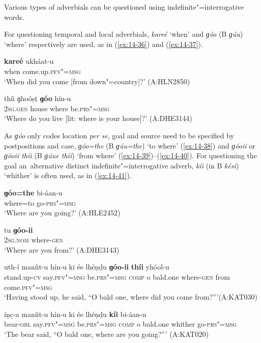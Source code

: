  Various types of adverbials can be questioned using indefinite"=interrogative words.


For questioning temporal and local adverbials, \textit{kareé} `when' and \textit{ɡóo} (B \textit{ɡúu}) `where' respectively are used, as in (\ref{ex:14-36}) and (\ref{ex:14-37}). 

\begin{exe}
\ex
\label{ex:14-36}
\gll \textbf{kareé} ukháat-u \\
when come.up.\textsc{pfv"=msg} \\
\glt `When did you come [from down"=country]?' (A:HLN2850)

\ex
\label{ex:14-37}
\gll thíi ɡhoóṣṭ \textbf{ɡóo} hín-u \\
\textsc{2sg.gen} house where be.\textsc{prs"=msg} \\
\glt `Where do you live [lit: where is your house]?' (A:DHE3144)
\end{exe}

As \textit{ɡóo} only codes location \textit{per se}, goal and source need to be specified by postpositions and case, \textit{ɡóo=the} (B \textit{ɡúu=the}) `to where' (\ref{ex:14-38}) and \textit{ɡóoii} or \textit{ɡóoii thíi} (B \textit{ɡúue thíi}) `from where' (\ref{ex:14-39})--(\ref{ex:14-40}). For questioning the goal an~alternative distinct indefinite"=interrogative adverb, \textit{kíi} (in B \textit{kési}) `whither' is often used, as in (\ref{ex:14-41}).

\begin{exe}
\ex
\label{ex:14-38}
\gll \textbf{ɡóo=the} bi-áan-u \\
where=to go-\textsc{prs"=msg } \\
\glt `Where are you going?' (A:HLE2452)

\ex
\label{ex:14-39}
\gll tu \textbf{ɡóo-ii} \\
\textsc{2sg.nom} where-\textsc{gen}  \\
\glt `Where are you from?' (A:DHE3143)

\ex
\label{ex:14-40}
\gll uth-í maníit-u hín-u ki ée lhéṇḍu \textbf{ɡóo-ii} \textbf{thíi} yhóol-u \\
stand.up-\textsc{cv} say.\textsc{pfv"=msg} be.\textsc{prs"=msg} \textsc{comp} o bald.one where-\textsc{gen} from come.\textsc{pfv"=msg} \\
\glt `Having stood up, he said, ``O bald one, where did you come from?'''\newline (A:KAT030)

\ex
\label{ex:14-41}
\gll íṇc̣-a maníit-u hín-u ki ée lhéṇḍu \textbf{kíi} bi-áan-u \\
bear-\textsc{obl} say.\textsc{pfv"=msg} be.\textsc{prs"=msg} \textsc{comp} o bald.one whither go-\textsc{prs"=msg} \\
\glt `The bear said, ``O bald one, where are you going?''' (A:KAT020)
\end{exe}


